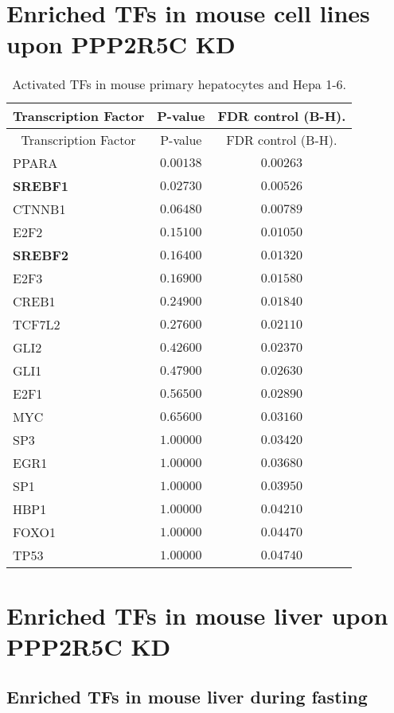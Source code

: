 \section{Enriched TFs in mouse cell lines upon PPP2R5C KD}

\begin{longtable}{lcc}
\caption{Activated TFs in mouse primary hepatocytes and Hepa 1-6.}
\label{tab:tab2.4}
\tabularnewline
\toprule
\multicolumn{1}{c}{Transcription Factor}&\multicolumn{1}{c}{P-value}&\multicolumn{1}{c}{FDR control (B-H)\tnote{a}.}\tabularnewline
\midrule
\endfirsthead


\multicolumn{1}{c}{Transcription Factor}&\multicolumn{1}{c}{P-value}&\multicolumn{1}{c}{FDR control (B-H)\tnote{a}.}\tabularnewline
\midrule
\endhead
\hline
\endfoot
PPARA&$0.00138$&$0.00263$\tabularnewline
\textbf{SREBF1}&$0.02730$&$0.00526$\tabularnewline
CTNNB1&$0.06480$&$0.00789$\tabularnewline
E2F2&$0.15100$&$0.01050$\tabularnewline
\textbf{SREBF2}&$0.16400$&$0.01320$\tabularnewline
E2F3&$0.16900$&$0.01580$\tabularnewline
CREB1&$0.24900$&$0.01840$\tabularnewline
TCF7L2&$0.27600$&$0.02110$\tabularnewline
GLI2&$0.42600$&$0.02370$\tabularnewline
GLI1&$0.47900$&$0.02630$\tabularnewline
E2F1&$0.56500$&$0.02890$\tabularnewline
MYC&$0.65600$&$0.03160$\tabularnewline
SP3&$1.00000$&$0.03420$\tabularnewline
EGR1&$1.00000$&$0.03680$\tabularnewline
SP1&$1.00000$&$0.03950$\tabularnewline
HBP1&$1.00000$&$0.04210$\tabularnewline
FOXO1&$1.00000$&$0.04470$\tabularnewline
TP53&$1.00000$&$0.04740$\tabularnewline
\bottomrule
\end{longtable}


\section{Enriched TFs in mouse liver upon PPP2R5C KD}

\subsection{Enriched TFs in mouse liver during fasting}

